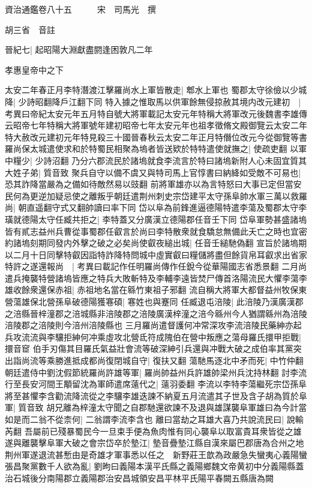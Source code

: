 資治通鑑卷八十五　　　宋　司馬光　撰

胡三省　音註

晉紀七|{
	起昭陽大淵獻盡閼逢困敦凡二年}


孝惠皇帝中之下

太安二年春正月李特潛渡江擊羅尚水上軍皆散走|{
	郫水上軍也}
蜀郡太守徐儉以少城降|{
	少詩昭翻降戶江翻下同}
特入據之惟取馬以供軍餘無侵掠赦其境内改元建初　|{
	考異曰帝紀太安元年五月特自號大將軍載記太安元年特稱大將軍改元後魏書李雄傳云昭帝七年特稱大將軍號年建初昭帝七年太安元年也祖孝徵脩文殿御覽云太安二年特大赦改元建初元年特見殺三十國晉春秋云太安二年正月特僭位改元今從御覽等書}
羅尚保太城遣使求和於特蜀民相聚為塢者皆送欵於特特遣使就撫之|{
	使疏吏翻}
以軍中糧少|{
	少詩沼翻}
乃分六郡流民於諸塢就食李流言於特曰諸塢新附人心未固宜質其大姓子弟|{
	質音致}
聚兵自守以備不虞又與特司馬上官惇書曰納絳如受敵不可易也|{
	恐其詐降當嚴為之備如待敵然易以豉翻}
前將軍雄亦以為言特怒曰大事已定但當安民何為更逆加疑忌使之離叛乎朝廷遣荆州刺史宗岱建平太守孫阜帥水軍三萬以救羅尚|{
	朝直遥翻守式又翻帥讀曰率下同}
岱以阜為前鋒進逼德陽特遣李蕩及蜀郡太守李璜就德陽太守任臧共拒之|{
	李特蓋又分廣漢立德陽郡任音壬下同}
岱阜軍勢甚盛諸塢皆有貳志益州兵曹從事蜀郡任叡言於尚曰李特散衆就食驕怠無備此夭亡之時也宜密約諸塢刻期同發内外擊之破之必矣尚使叡夜縋出城|{
	任音壬縋馳偽翻}
宣旨於諸塢期以二月十日同擊特叡因詣特詐降特問城中虛實叡曰糧儲將盡但餘貨帛耳叡求出省家特許之遂還報尚　|{
	考異曰載記作任明羅尚傳作任銳今從華陽國志省悉景翻}
二月尚遣兵掩襲特營諸塢皆應之特兵大敗斬特及李輔李遠皆焚尸傳首洛陽流民大懼李蕩李雄收餘衆還保赤祖|{
	赤祖地名當在緜竹東祖子邪翻}
流自稱大將軍大都督益州牧保東營蕩雄保北營孫阜破德陽獲寋碩|{
	寋姓也與蹇同}
任臧退屯涪陵|{
	此涪陵乃漢廣漢郡之涪縣晉梓潼郡之涪城縣非涪陵郡之涪陵廣漢梓潼之涪今緜州今人猶謂緜州為涪陵涪陵郡之涪陵則今涪州涪陵縣也}
三月羅尚遣督護何冲常深攻李流涪陵民藥紳亦起兵攻流流與李驤拒紳何冲乘虛攻北營氐符成隗伯在營中叛應之蕩母羅氏擐甲拒戰|{
	擐音䆠}
伯手刃傷其目羅氏氣益壯會流等破深紳引兵還與冲戰大破之成伯率其黨突出詣尚流等乘勝進抵成都尚復閉城自守|{
	復扶又翻}
蕩馳馬逐北中矛而死|{
	中竹仲翻}
朝廷遣侍中劉沈假節統羅尚許雄等軍|{
	羅尚帥益州兵許雄帥梁州兵沈持林翻}
討李流行至長安河間王顒留沈為軍師遣席薳代之|{
	薳羽委翻}
李流以李特李蕩繼死宗岱孫阜將至甚懼李含勸流降流從之李驤李雄迭諫不納夏五月流遣其子世及含子胡為質於阜軍|{
	質音致}
胡兄離為梓潼太守聞之自郡馳還欲諫不及退與雄謀襲阜軍雄曰為今計當如是而二翁不從柰何|{
	二翁謂李流李含也}
離曰當劫之耳雄大喜乃共說流民曰|{
	說輸芮翻}
吾屬前已殘暴蜀民今一旦束手便為魚肉惟有同心襲阜以取富貴耳衆皆從之雄遂與離襲擊阜軍大破之會宗岱卒於墊江|{
	墊音疊墊江縣自漢來屬巴郡唐為合州之地}
荆州軍遂退流甚慙由是奇雄才軍事悉以任之　新野莊王歆為政嚴急失蠻夷心義陽蠻張昌聚黨數千人欲為亂|{
	劉昫曰義陽本漢平氏縣之義陽鄉魏文帝黄初中分義陽縣蓋治石城後分南陽郡立義陽郡治安昌城領安昌平林平氏陽平春闕五縣唐為闕}
